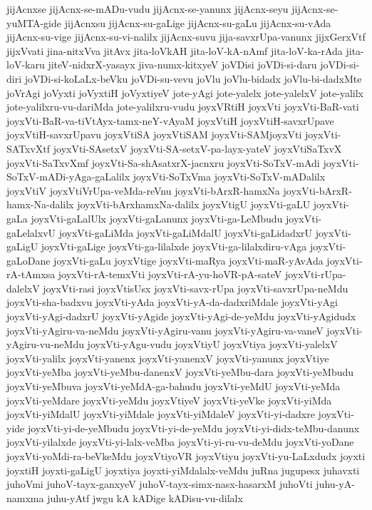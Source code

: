 {jijAcnxse
jijAcnx-se-mADu-vudu
jijAcnx-se-yanunx
jijAcnx-seyu
jijAcnx-se-yuMTA-gide
jijAcnxsu
jijAcnx-su-gaLige
jijAcnx-su-gaLu
jijAcnx-su-vAda
jijAcnx-su-vige
jijAcnx-su-vi-nalilx
jijAcnx-suvu
jija-savxrUpa-vanunx
jijxGerxVtf
jijxVvati
jina-nitxVva
jitAvx
jita-loVkAH
jita-loV-kA-nAmf
jita-loV-ka-rAda
jita-loV-karu
jiteV-nidxrX-yasayx
jiva-numx-kitxyeV
joVDisi
joVDi-si-daru
joVDi-si-diri
joVDi-si-koLaLx-beVku
joVDi-su-vevu
joVlu
joVlu-bidadx
joVlu-bi-dadxMte
joVrAgi
joVyxti
joVyxtiH
joVyxtiyeV
jote-yAgi
jote-yalelx
jote-yalelxV
jote-yalilx
jote-yalilxru-vu-dariMda
jote-yalilxru-vudu
joyxVRtiH
joyxVti
joyxVti-BaR-vati
joyxVti-BaR-va-tiVtAyx-tamx-neY-vAyaM
joyxVtiH
joyxVtiH-savxrUpave
joyxVtiH-savxrUpavu
joyxVtiSA
joyxVtiSAM
joyxVti-SAMjoyxVti
joyxVti-SATxvXtf
joyxVti-SAsetxV
joyxVti-SA-setxV-pa-layx-yateV
joyxVtiSaTxvX
joyxVti-SaTxvXmf
joyxVti-Sa-shAsatxrX-jacnxru
joyxVti-SoTxV-mAdi
joyxVti-SoTxV-mADi-yAga-gaLalilx
joyxVti-SoTxVma
joyxVti-SoTxV-mADalilx
joyxVtiV
joyxVtiVrUpa-veMda-reVnu
joyxVti-bArxR-hamxNa
joyxVti-bArxR-hamx-Na-dalilx
joyxVti-bArxhamxNa-dalilx
joyxVtigU
joyxVti-gaLU
joyxVti-gaLa
joyxVti-gaLalUlx
joyxVti-gaLanunx
joyxVti-ga-LeMbudu
joyxVti-gaLelalxvU
joyxVti-gaLiMda
joyxVti-gaLiMdalU
joyxVti-gaLidadxrU
joyxVti-gaLigU
joyxVti-gaLige
joyxVti-ga-lilalxde
joyxVti-ga-lilalxdiru-vAga
joyxVti-gaLoDane
joyxVti-gaLu
joyxVtige
joyxVti-maRya
joyxVti-maR-yAvAda
joyxVti-rA-tAmxsa
joyxVti-rA-temxVti
joyxVti-rA-yu-hoVR-pA-sateV
joyxVti-rUpa-dalelxV
joyxVti-rasi
joyxVtisUsx
joyxVti-savx-rUpa
joyxVti-savxrUpa-neMdu
joyxVti-sha-badxvu
joyxVti-yAda
joyxVti-yA-da-dadxriMdale
joyxVti-yAgi
joyxVti-yAgi-dadxrU
joyxVti-yAgide
joyxVti-yAgi-de-yeMdu
joyxVti-yAgidudx
joyxVti-yAgiru-va-neMdu
joyxVti-yAgiru-vanu
joyxVti-yAgiru-va-vaneV
joyxVti-yAgiru-vu-neMdu
joyxVti-yAgu-vudu
joyxVtiyU
joyxVtiya
joyxVti-yalelxV
joyxVti-yalilx
joyxVti-yanenx
joyxVti-yanenxV
joyxVti-yanunx
joyxVtiye
joyxVti-yeMba
joyxVti-yeMbu-danenxV
joyxVti-yeMbu-dara
joyxVti-yeMbudu
joyxVti-yeMbuva
joyxVti-yeMdA-ga-bahudu
joyxVti-yeMdU
joyxVti-yeMda
joyxVti-yeMdare
joyxVti-yeMdu
joyxVtiyeV
joyxVti-yeVke
joyxVti-yiMda
joyxVti-yiMdalU
joyxVti-yiMdale
joyxVti-yiMdaleV
joyxVti-yi-dadxre
joyxVti-yide
joyxVti-yi-de-yeMbudu
joyxVti-yi-de-yeMdu
joyxVti-yi-didx-teMbu-danunx
joyxVti-yilalxde
joyxVti-yi-lalx-veMba
joyxVti-yi-ru-vu-deMdu
joyxVti-yoDane
joyxVti-yoMdi-ra-beVkeMdu
joyxVtiyoVR
joyxVtiyu
joyxVti-yu-LaLxdudx
joyxti
joyxtiH
joyxti-gaLigU
joyxtiya
joyxti-yiMdalalx-veMdu
juRna
jugupesx
juhavxti
juhoVmi
juhoV-tayx-ganxyeV
juhoV-tayx-simx-nasx-hasarxM
juhoVti
juhu-yA-namxma
juhu-yAtf
jwgu
kA
kADige
kADisu-vu-dilalx
}
